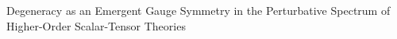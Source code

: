 \documentclass[twocolumn]{aastex631}
\begin{document}
Degeneracy as an Emergent Gauge Symmetry in the Perturbative Spectrum of Higher-Order Scalar-Tensor Theories
\end{document}
